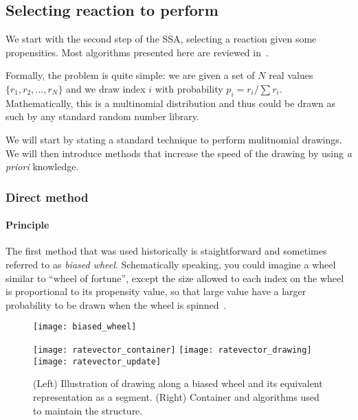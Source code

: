 \subsection {Selecting reaction to perform}
\label{sec:reaction_selection}

We start with the second step of the SSA, selecting a reaction given some propensities. Most algorithms presented here are reviewed in~\citet{gillespie_perspective:_2013}.

Formally, the problem is quite simple: we are given a set of $N$ real values $\{ r_1, r_2, ..., r_N \}$ and we draw index $i$ with probability $p_i = r_i / \sum r_i$. Mathematically, this is a multinomial distribution and thus could be drawn as such by any standard random number library.

We will start by stating a standard technique to perform mulitnomial drawings. We will then introduce methods that increase the speed of the drawing by using \textit {a priori} knowledge.

\subsubsection {Direct method}

\paragraph {Principle}

The first method that was used historically is staightforward and sometimes referred to as \textit {biased wheel}. Schematically speaking, you could imagine a wheel similar to ``wheel of fortune'', except the size allowed to each index on the wheel is proportional to its propensity value, so that large value have a larger probability to be drawn when the wheel is spinned~.

\begin{figure}[!h]
  \centering
  \begin{minipage}{\textwidth}
    \begin{minipage}{0.5\textwidth}
      \texttt{[image: biased\_wheel]}
    \end{minipage}
    \begin{minipage}{0.5\textwidth}
      \texttt{[image: ratevector\_container]}
      \texttt{[image: ratevector\_drawing]}
      \texttt{[image: ratevector\_update]}
    \end{minipage}
  \end{minipage}
  \caption{(Left) Illustration of drawing along a biased wheel and its equivalent representation as a segment. (Right) Container and algorithms used to maintain the structure.}
  \label{fig:biased_wheel}
\end {figure}

